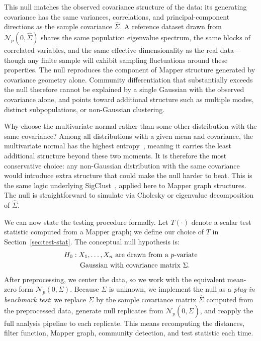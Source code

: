 \documentclass[hidelinks]{siamart251216}
\begin{document}
This null matches the observed covariance structure of the data: its
generating covariance has the same variances, correlations, and
principal-component directions as the sample covariance $\hat{\Sigma}$.
A reference dataset drawn from $\mathcal{N}_p(0, \hat{\Sigma})$ shares
the same population eigenvalue spectrum, the same blocks of correlated
variables, and the same effective dimensionality as the real
data---though any finite sample will exhibit sampling fluctuations
around these properties. The null reproduces the component of Mapper structure
generated by covariance geometry alone.  Community differentiation
that substantially exceeds the null therefore cannot be explained by a
single Gaussian with the observed covariance alone, and points toward
additional structure such as multiple modes, distinct subpopulations, or
non-Gaussian clustering.

Why choose the multivariate normal rather than some other distribution
with the same covariance?  Among all distributions with a given mean and
covariance, the multivariate normal has the highest
entropy~\citep{CoverThomas2006}, meaning it carries the least additional
structure beyond these two moments.  It is therefore the most
conservative choice: any non-Gaussian distribution with the same
covariance would introduce extra structure that could make the null
harder to beat.  This is the same logic underlying
SigClust~\citep{Liu2008}, applied here to Mapper graph structures.  The
null is straightforward to simulate via Cholesky or eigenvalue
decomposition of $\hat{\Sigma}$.

We can now state the testing procedure formally.  Let $T(\cdot)$
denote a scalar test statistic computed from a Mapper graph; we define
our choice of $T$ in Section~\ref{sec:test-stat}.  The conceptual null
hypothesis is:
\begin{align}
  H_0 &: X_1, \ldots, X_n \text{ are drawn from a $p$-variate} \notag \\
  &\quad \text{Gaussian with covariance matrix } \Sigma. \label{eq:H0}
\end{align}
After preprocessing, we center the data, so we work with the equivalent
mean-zero form $\mathcal{N}_p(0, \Sigma)$.  Because $\Sigma$ is
unknown, we implement the null as a \emph{plug-in benchmark test}: we
replace $\Sigma$ by the sample covariance matrix $\hat{\Sigma}$ computed
from the preprocessed data, generate null replicates from
$\mathcal{N}_p(0, \hat{\Sigma})$, and reapply the full analysis pipeline
to each replicate.  This means recomputing the distances, filter
function, Mapper graph, community detection, and test statistic each
time.
\end{document}
